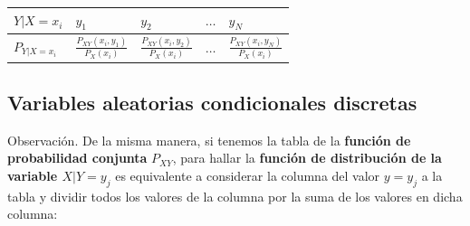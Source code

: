\documentclass[]{book}
\begin{document}
\begin{longtable}[]{@{}lllll@{}}
\toprule
\begin{minipage}[b]{0.17\columnwidth}\raggedright
\(Y|X=x_i\)\strut
\end{minipage} & \begin{minipage}[b]{0.17\columnwidth}\raggedright
\(y_1\)\strut
\end{minipage} & \begin{minipage}[b]{0.17\columnwidth}\raggedright
\(y_2\)\strut
\end{minipage} & \begin{minipage}[b]{0.17\columnwidth}\raggedright
\(\ldots\)\strut
\end{minipage} & \begin{minipage}[b]{0.17\columnwidth}\raggedright
\(y_N\)\strut
\end{minipage}\tabularnewline
\midrule
\endhead
\begin{minipage}[t]{0.17\columnwidth}\raggedright
\(P_{Y|X=x_i}\)\strut
\end{minipage} & \begin{minipage}[t]{0.17\columnwidth}\raggedright
\(\frac{P_{XY}(x_i,y_1)}{P_X(x_i)}\)\strut
\end{minipage} & \begin{minipage}[t]{0.17\columnwidth}\raggedright
\(\frac{P_{XY}(x_i,y_2)}{P_X(x_i)}\)\strut
\end{minipage} & \begin{minipage}[t]{0.17\columnwidth}\raggedright
\(\ldots\)\strut
\end{minipage} & \begin{minipage}[t]{0.17\columnwidth}\raggedright
\(\frac{P_{XY}(x_i,y_N)}{P_X(x_i)}\)\strut
\end{minipage}\tabularnewline
\bottomrule
\end{longtable}

\hypertarget{variables-aleatorias-condicionales-discretas-5}{%
\subsection{Variables aleatorias condicionales discretas}\label{variables-aleatorias-condicionales-discretas-5}}

Observación.
De la misma manera, si tenemos la tabla de la \textbf{función de probabilidad conjunta} \(P_{XY}\), para hallar la \textbf{función de distribución de la variable \(X|Y=y_j\)} es equivalente a considerar la columna del valor \(y=y_j\) a la tabla y dividir todos los valores de la columna por la suma de los valores en dicha columna:
\end{document}
